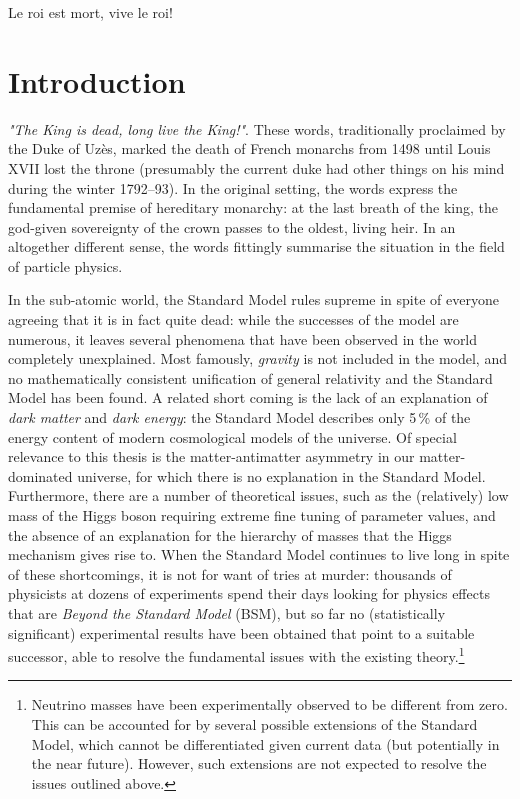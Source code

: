 \begin{savequote}[8cm]
Le roi est mort, vive le roi!
\end{savequote}

\chapter{Introduction}
\label{ch:1-intro} 

\emph{"The King is dead, long live the King!"}. These words, traditionally proclaimed by the Duke of Uzès, marked the death of French monarchs from 1498 until Louis XVII lost the throne (presumably the current duke had other things on his mind during the winter 1792--93). In the original setting, the words express the fundamental premise of hereditary monarchy: at the last breath of the king, the god-given sovereignty of the crown passes to the oldest, living heir. In an altogether different sense, the words fittingly summarise the situation in the field of particle physics.

In the sub-atomic world, the Standard Model rules supreme in spite of everyone agreeing that it is in fact quite dead: while the successes of the model are numerous, it leaves several phenomena that have been observed in the world completely unexplained. Most famously, \emph{gravity} is not included in the model, and no mathematically consistent unification of general relativity and the Standard Model has been found. A related short coming is the lack of an explanation of \emph{dark matter} and \emph{dark energy}: the Standard Model describes only 5\,\% of the energy content of modern cosmological models of the universe. Of special relevance to this thesis is the matter-antimatter asymmetry in our matter-dominated universe, for which there is no explanation in the Standard Model. Furthermore, there are a number of theoretical issues, such as the (relatively) low mass of the Higgs boson requiring extreme fine tuning of parameter values, and the absence of an explanation for the hierarchy of masses that the Higgs mechanism gives rise to.
When the Standard Model continues to live long in spite of these shortcomings, it is not for want of tries at murder: thousands of physicists at dozens of experiments spend their days looking for physics effects that are \emph{Beyond the Standard Model} (BSM), but so far no (statistically significant) experimental results have been obtained that point to a suitable successor, able to resolve the fundamental issues with the existing theory.\footnote{Neutrino masses have been experimentally observed to be different from zero. This can be accounted for by several possible extensions of the Standard Model, which cannot be differentiated given current data (but potentially in the near future). However, such extensions are not expected to resolve the issues outlined above.} 

